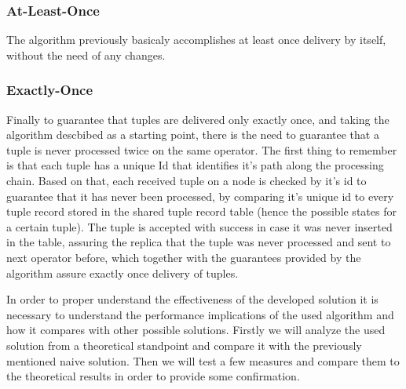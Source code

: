 \documentclass[times, 10pt,twocolumn]{article}
\newcommand{\forceindent}{\leavevmode{\parindent=1em\indent}}
\begin{document}
\subsubsection{At-Least-Once}

\forceindent The algorithm previously basicaly accomplishes at least once
delivery by itself, without the need of any changes. 

\subsubsection{Exactly-Once}

\forceindent Finally to guarantee that tuples are delivered only exactly
once, and taking the algorithm descbibed as a starting point, there is the
need to guarantee that a tuple is never processed twice on the same
operator. The first thing to remember is that each tuple has a unique Id
that identifies it's path along the processing chain. Based on that, each
received tuple on a node is checked by it's id to guarantee that it has
never been processed, by comparing it's unique id to every tuple record
stored in the shared tuple record table (hence the possible states for a
certain tuple).  The tuple is accepted with success in case it was never
inserted in the table, assuring the replica that the tuple was never
processed and sent to next operator before, which together with the
guarantees provided by the algorithm assure exactly once delivery of
tuples.


In order to proper understand the effectiveness of the developed solution
it is necessary to understand the performance implications of the used
algorithm and how it compares with other possible solutions. Firstly we
will analyze the used solution from a theoretical standpoint and compare
it with the previously mentioned naive solution. Then we will test a few
measures and compare them to the theoretical results in order to provide
some confirmation.

\end{document}
